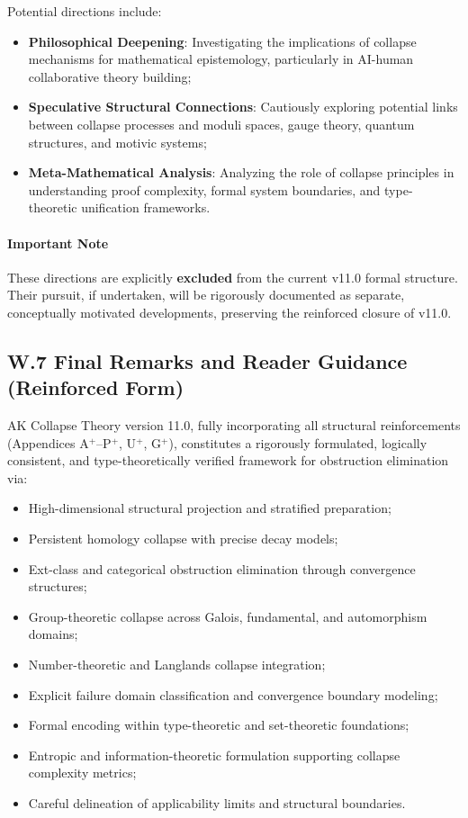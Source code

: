 \documentclass[11pt]{article}
\begin{document}
Potential directions include:

\begin{itemize}
    \item \textbf{Philosophical Deepening}: Investigating the implications of collapse mechanisms for mathematical epistemology, particularly in AI-human collaborative theory building;
    \item \textbf{Speculative Structural Connections}: Cautiously exploring potential links between collapse processes and moduli spaces, gauge theory, quantum structures, and motivic systems;
    \item \textbf{Meta-Mathematical Analysis}: Analyzing the role of collapse principles in understanding proof complexity, formal system boundaries, and type-theoretic unification frameworks.
\end{itemize}

\paragraph{Important Note}  
These directions are explicitly \textbf{excluded} from the current v11.0 formal structure. Their pursuit, if undertaken, will be rigorously documented as separate, conceptually motivated developments, preserving the reinforced closure of v11.0.

\subsection*{W.7 Final Remarks and Reader Guidance (Reinforced Form)}

AK Collapse Theory version 11.0, fully incorporating all structural reinforcements (Appendices A$^{+}$–P$^{+}$, U$^{+}$, G$^{+}$), constitutes a rigorously formulated, logically consistent, and type-theoretically verified framework for obstruction elimination via:

\begin{itemize}
    \item High-dimensional structural projection and stratified preparation;
    \item Persistent homology collapse with precise decay models;
    \item Ext-class and categorical obstruction elimination through convergence structures;
    \item Group-theoretic collapse across Galois, fundamental, and automorphism domains;
    \item Number-theoretic and Langlands collapse integration;
    \item Explicit failure domain classification and convergence boundary modeling;
    \item Formal encoding within type-theoretic and set-theoretic foundations;
    \item Entropic and information-theoretic formulation supporting collapse complexity metrics;
    \item Careful delineation of applicability limits and structural boundaries.
\end{itemize}
\end{document}
